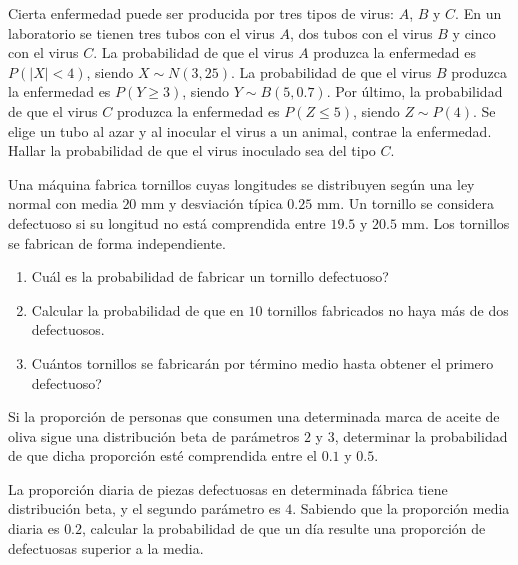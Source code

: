 \begin{ejercicio}
    Cierta enfermedad puede ser producida por tres tipos de virus: $A$, $B$ y $C$. En un laboratorio se tienen tres tubos con el virus $A$, dos tubos con el virus $B$ y cinco con el virus $C$. La probabilidad de que el virus $A$ produzca la enfermedad es $P(|X| < 4)$, siendo $X \sim N(3,25)$. La probabilidad de que el virus $B$ produzca la enfermedad es $P(Y \geq 3)$, siendo $Y \sim B(5,0.7)$. Por último, la probabilidad de que el virus $C$ produzca la enfermedad es $P(Z \leq 5)$, siendo $Z \sim P(4)$. Se elige un tubo al azar y al inocular el virus a un animal, contrae la enfermedad. Hallar la probabilidad de que el virus inoculado sea del tipo $C$.
\end{ejercicio}

\begin{ejercicio}
    Una máquina fabrica tornillos cuyas longitudes se distribuyen según una ley normal con media $20$ mm y desviación típica $0.25$ mm. Un tornillo se considera defectuoso si su longitud no está comprendida entre $19.5$ y $20.5$ mm. Los tornillos se fabrican de forma independiente.
    \begin{enumerate}
        \item Cuál es la probabilidad de fabricar un tornillo defectuoso?
        \item Calcular la probabilidad de que en $10$ tornillos fabricados no haya más de dos defectuosos.
        \item Cuántos tornillos se fabricarán por término medio hasta obtener el primero defectuoso?
    \end{enumerate}
\end{ejercicio}

\begin{ejercicio}
    Si la proporción de personas que consumen una determinada marca de aceite de oliva sigue una distribución beta de parámetros $2$ y $3$, determinar la probabilidad de que dicha proporción esté comprendida entre el $0.1$ y $0.5$.
\end{ejercicio}

\begin{ejercicio}
    La proporción diaria de piezas defectuosas en determinada fábrica tiene distribución beta, y el segundo parámetro es $4$. Sabiendo que la proporción media diaria es $0.2$, calcular la probabilidad de que un día resulte una proporción de defectuosas superior a la media.
\end{ejercicio}













